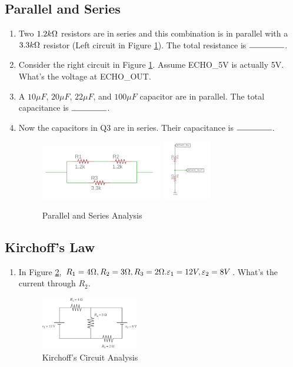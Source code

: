 \documentclass{article}
\newcommand{\ans}{$\rule{1.5cm}{0.15mm}$}
\begin{document}
\subsection{Parallel and Series}
\begin{enumerate}
	\item Two $1.2 k \ohm$ resistors are in series and this combination is in parallel with a $3.3 k\ohm$ resistor (Left circuit in Figure \ref{fig:parallel}). The total resistance is \ans.
	\item Consider the right circuit in Figure \ref{fig:parallel}. Assume ECHO\_5V is actually 5V. What's the voltage at ECHO\_OUT.
	\item A $10 \mu F$, $20 \mu F$, $22 \mu F$, and $100 \mu F$ capacitor are in parallel. The total capacitance is \ans.
	\item Now the capacitors in Q3 are in series. Their capacitance is \ans.
	
	\begin{figure}[h]
		\center
		\includegraphics[width=0.5\textwidth, keepaspectratio]{parallel}
		\includegraphics[width=0.2\textwidth, keepaspectratio]{vdivide}
		\caption{Parallel and Series Analysis}
		\label{fig:parallel}
	\end{figure}
	
	
\end{enumerate}
\subsection{Kirchoff's Law}
\begin{enumerate}
	\item In Figure \ref{fig:kirchof}, $R_1=4\ohm ,R_2=3\ohm,R_3=2\ohm. \varepsilon_1=12V, \varepsilon_2=8V$. What's the current through $ R_2 $.
	\begin{figure}[!h]
		\center
		\includegraphics[width=0.4\textwidth, keepaspectratio]{kirchof}
		\caption{Kirchoff's Circuit Analysis}
		\label{fig:kirchof}
	\end{figure}
\end{enumerate}
\end{document}

